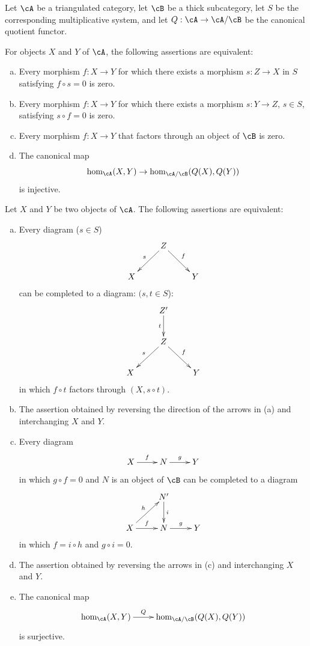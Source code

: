 Let $\cA$ be a triangulated category, let $\cB$ be a thick subcategory,
let $S$ be the corresponding multiplicative system, and let
$Q:\cA\to \cA/\cB$ be the canonical quotient functor.

\begin{proposition}\label{VIII:2-5-1}
For objects $X$ and $Y$ of $\cA$, the following assertions are equivalent:
\begin{enumerate}[(a)]
  \item Every morphism $f:X\to Y$ for which there exists a morphism
    $s:Z\to X$ in $S$ satisfying $f\circ s=0$ is zero.
  \item Every morphism $f:X\to Y$ for which there exists a morphism
    $s:Y\to Z$, $s\in S$, satisfying $s\circ f=0$ is zero.
  \item Every morphism $f:X\to Y$ that factors through an object of $\cB$
    is zero.
  \item The canonical map
    \[
      \hom_\cA(X,Y) \to \hom_{\cA/\cB}(Q(X),Q(Y))
    \]
    is injective.
\end{enumerate}
\end{proposition}

\begin{proposition}\label{VIII:2-5-2}
Let $X$ and $Y$ be two objects of $\cA$. The following assertions are
equivalent:
\begin{enumerate}[(a)]
  \item Every diagram ($s\in S$)
    \[\xymatrix{
      & Z \ar[dl]_-s \ar[dr]^-f \\
      X
        & & Y
    }\]
    can be completed to a diagram: $(s,t\in S$):
    \[\xymatrix{
      & Z' \ar[d]_-t \\
      & Z \ar[dl]_-s \ar[dr]^-f \\
      X
        & & Y
    }\]
    in which $f\circ t$ factors through $(X,s\circ t)$.
  \item The assertion obtained by reversing the direction of the arrows in
    (a) and interchanging $X$ and $Y$.
  \item Every diagram
    \[\xymatrix{
      X \ar[r]^-f
        & N \ar[r]^-g
        & Y
    }\]
    in which $g\circ f=0$ and $N$ is an object of $\cB$ can be completed
    to a diagram
    \[\xymatrix{
      & N' \ar[d]^-i \\
      X \ar[ur]^-h \ar[r]^-f
        & N \ar[r]^-g
        & Y
    }\]
    in which $f=i\circ h$ and $g\circ i=0$.
  \item The assertion obtained by reversing the arrows in (c) and
    interchanging $X$ and $Y$.
  \item The canonical map
    \[\xymatrix{
      \hom_\cA(X,Y) \ar[r]^-Q
        & \hom_{\cA/\cB}(Q(X),Q(Y))
    }\]
    is surjective.
\end{enumerate}
\end{proposition}

